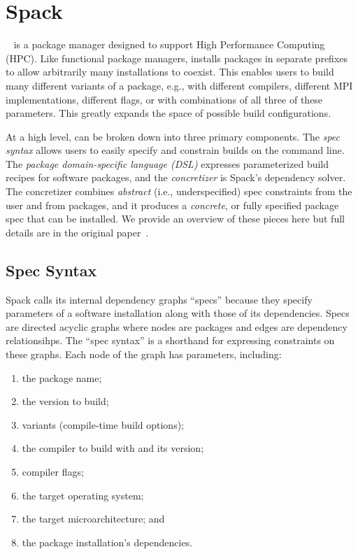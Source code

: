 \section{Spack}
\label{sec:software-model}

\spack~\cite{gamblin+:sc15} is a package manager designed to support High Performance
Computing (HPC). Like functional package managers, \spack installs packages in separate
prefixes to allow arbitrarily many installations to coexist. This enables users to build
many different variants of a package, e.g., with different compilers, different MPI
implementations, different flags, or with combinations of all three of these parameters.
This greatly expands the space of possible build configurations.

At a high level, \spack can be broken down into three primary components. The {\it spec
  syntax} allows users to easily specify and constrain builds on the command line. The
{\it package domain-specific language (DSL)} expresses parameterized build recipes for
software packages, and the {\it concretizer} is Spack's dependency solver. The
concretizer combines {\it abstract} (i.e., underspecified) spec constraints from the
user and from packages, and it produces a {\it concrete}, or fully specified package
spec that can be installed. We provide an overview of these pieces here but full details
are in the original paper~\cite{gamblin+:sc15}.

\subsection{Spec Syntax}
\label{sec:specs}

Spack calls its internal dependency graphs ``specs'' because they specify parameters of
a software installation along with those of its dependencies. Specs are directed acyclic
graphs where nodes are packages and edges are dependency relationsihps. The ``spec
syntax'' is a shorthand for expressing constraints on these graphs. Each node of the
graph has parameters, including:
\begin{enumerate}
\item the package name;
\item the version to build;
\item variants (compile-time build options);
\item the compiler to build with and its version;
\item compiler flags;
\item the target operating system;
\item the target microarchitecture; and
\item the package installation's dependencies.
\end{enumerate}

